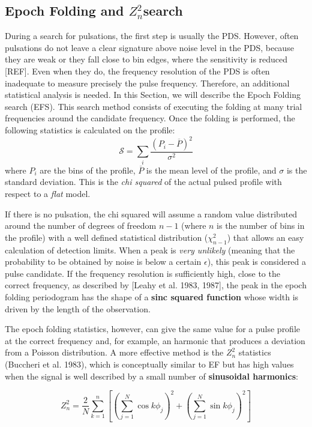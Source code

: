 \documentclass[12pt]{emulateapj}
\newcommand{\zsq}{\ensuremath{Z^2_n}}
\begin{document}
\subsection{Epoch Folding and \zsq search}
\label{sec:efzsq}
During a search for pulsations, the first step is usually the PDS. 
However, often pulsations do not leave a clear signature above noise level in the PDS, because they are weak or they fall close to bin edges, where the sensitivity is reduced [REF].
Even when they do, the frequency resolution of the PDS is often inadequate to measure precisely the pulse frequency.
Therefore, an additional statistical analysis is needed. 
In this Section, we will describe the Epoch Folding search (EFS).
This search method consists of executing the folding at many trial frequencies around the candidate frequency.
Once the folding is performed, the following statistics is calculated on the profile:
\begin{equation}
\mathcal{S} = \sum_i\frac{(P_i - \overline{P})^2}{\sigma^2}
\end{equation}
where $P_i$ are the bins of the profile, $\overline{P}$ is the mean level of the profile, and $\sigma$ is the standard deviation.
This is the \textit{chi squared} of the actual pulsed profile with respect to a \textit{flat} model.

If there is no pulsation, the chi squared will assume a random value distributed around the number of degrees of freedom $n - 1$ (where $n$ is the number of bins in the profile) with a well defined statistical distribution ($\chi^2_{n - 1}$) that allows an easy calculation of detection limits. 
When a peak is \textit{very unlikely} (meaning that the probability to be obtained by noise is below a certain $\epsilon$), this peak is considered a pulse candidate.
If the frequency resolution is sufficiently high, close to the correct frequency, as described by [Leahy et al. 1983, 1987], the peak in the epoch folding periodogram has the shape of a \textbf{sinc squared function} whose width is driven by the length of the observation.

The epoch folding statistics, however, can give the same value for a pulse profile at the correct frequency and, for example, an harmonic that produces a deviation from a Poisson distribution.
A more effective method is the $Z^2_n$ statistics (Buccheri et al. 1983), which is conceptually similar to EF but has high values when the signal is well described by a small number of \textbf{sinusoidal harmonics}: 

\begin{equation}
\zsq = \dfrac{2}{N} \sum_{k=1}^n \left[{\left(\sum_{j=1}^N \cos k \phi_j\right)}^2 + {\left(\sum_{j=1}^N \sin k \phi_j\right)}^2\right]
\end{equation}
\end{document}

